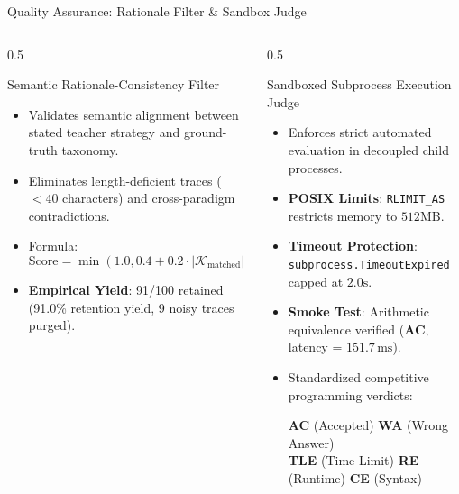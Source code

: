 \documentclass[aspectratio=169,10pt]{beamer}
\begin{document}
\begin{frame}{Quality Assurance: Rationale Filter \& Sandbox Judge}
  \begin{columns}[T]
    \begin{column}{0.5\textwidth}
      \begin{block}{Semantic Rationale-Consistency Filter}
        \begin{itemize}\itemsep=3pt
          \item Validates semantic alignment between stated teacher strategy and ground-truth taxonomy.
          \item Eliminates length-deficient traces ($<40$ characters) and cross-paradigm contradictions.
          \item Formula:
            $$\text{Score} = \min(1.0, 0.4 + 0.2 \cdot |\mathcal{K}_{\text{matched}}|)$$
          \item \textbf{Empirical Yield}: 91/100 retained (91.0\% retention yield, 9 noisy traces purged).
        \end{itemize}
      \end{block}
    \end{column}

    \begin{column}{0.5\textwidth}
      \begin{exampleblock}{Sandboxed Subprocess Execution Judge}
        \begin{itemize}\itemsep=3pt
          \item Enforces strict automated evaluation in decoupled child processes.
          \item \textbf{POSIX Limits}: \texttt{RLIMIT\_AS} restricts memory to $512\text{MB}$.
          \item \textbf{Timeout Protection}: \texttt{subprocess.TimeoutExpired} capped at $2.0\text{s}$.
          \item \textbf{Smoke Test}: Arithmetic equivalence verified (\textbf{AC}, latency = $151.7\,\text{ms}$).
          \item Standardized competitive programming verdicts:
            \begin{center}
              \textbf{AC} (Accepted) \quad \textbf{WA} (Wrong Answer) \\
              \textbf{TLE} (Time Limit) \quad \textbf{RE} (Runtime) \quad \textbf{CE} (Syntax)
            \end{center}
        \end{itemize}
      \end{exampleblock}
    \end{column}
  \end{columns}
\end{frame}
\end{document}
